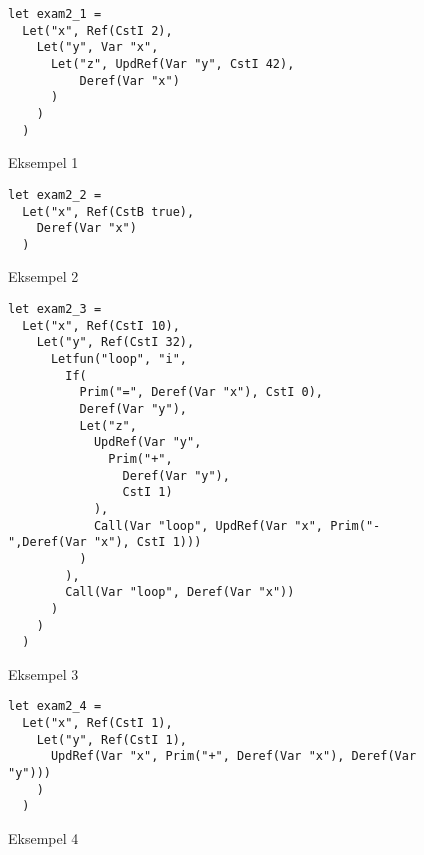 \begin{figure}[!ht]
    \begin{lstlisting}[style=fsharp]
let exam2_1 = 
  Let("x", Ref(CstI 2),
    Let("y", Var "x",
      Let("z", UpdRef(Var "y", CstI 42),
          Deref(Var "x")
      )
    )
  )
    \end{lstlisting}
    \caption{Eksempel 1}\label{fig:2016:udtryk1}
\end{figure}
\begin{figure}[!ht]
    \begin{lstlisting}[style=fsharp]
let exam2_2 = 
  Let("x", Ref(CstB true),
    Deref(Var "x")
  )
    \end{lstlisting}
    \caption{Eksempel 2}\label{fig:2016:udtryk2}
\end{figure}
\begin{figure}[!ht]
    \begin{lstlisting}[style=fsharp]
let exam2_3 = 
  Let("x", Ref(CstI 10),
    Let("y", Ref(CstI 32),
      Letfun("loop", "i",
        If(
          Prim("=", Deref(Var "x"), CstI 0),
          Deref(Var "y"),
          Let("z", 
            UpdRef(Var "y", 
              Prim("+",
                Deref(Var "y"), 
                CstI 1)
            ),
            Call(Var "loop", UpdRef(Var "x", Prim("-",Deref(Var "x"), CstI 1)))
          )
        ),
        Call(Var "loop", Deref(Var "x"))
      )
    )
  )
    \end{lstlisting}
    \caption{Eksempel 3}\label{fig:2016:udtryk3}
\end{figure}
\begin{figure}[!ht]
    \begin{lstlisting}[style=fsharp]
let exam2_4 = 
  Let("x", Ref(CstI 1),
    Let("y", Ref(CstI 1),
      UpdRef(Var "x", Prim("+", Deref(Var "x"), Deref(Var "y")))
    )
  )
    \end{lstlisting}
    \caption{Eksempel 4}\label{fig:2016:udtryk4}
\end{figure}
